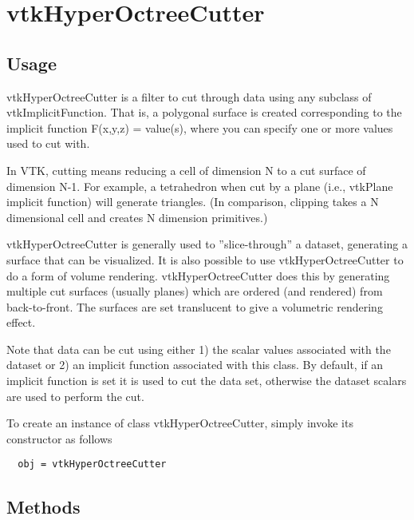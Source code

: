 \section{vtkHyperOctreeCutter}

\subsection{Usage}

 vtkHyperOctreeCutter is a filter to cut through data using any subclass of 
 vtkImplicitFunction. That is, a polygonal surface is created
 corresponding to the implicit function F(x,y,z) = value(s), where
 you can specify one or more values used to cut with.

 In VTK, cutting means reducing a cell of dimension N to a cut surface
 of dimension N-1. For example, a tetrahedron when cut by a plane (i.e.,
 vtkPlane implicit function) will generate triangles. (In comparison,
 clipping takes a N dimensional cell and creates N dimension primitives.)

 vtkHyperOctreeCutter is generally used to ''slice-through'' a dataset,
 generating a surface that can be visualized. It is also possible to use
 vtkHyperOctreeCutter to do a form of volume rendering. vtkHyperOctreeCutter
 does this by generating multiple cut surfaces (usually planes) which are
 ordered (and rendered) from back-to-front. The surfaces are set translucent
 to give a volumetric rendering effect.

 Note that data can be cut using either 1) the scalar values associated
 with the dataset or 2) an implicit function associated with this class.
 By default, if an implicit function is set it is used to cut the data
 set, otherwise the dataset scalars are used to perform the cut.

To create an instance of class vtkHyperOctreeCutter, simply
invoke its constructor as follows
\begin{verbatim}
  obj = vtkHyperOctreeCutter
\end{verbatim}
\subsection{Methods}

